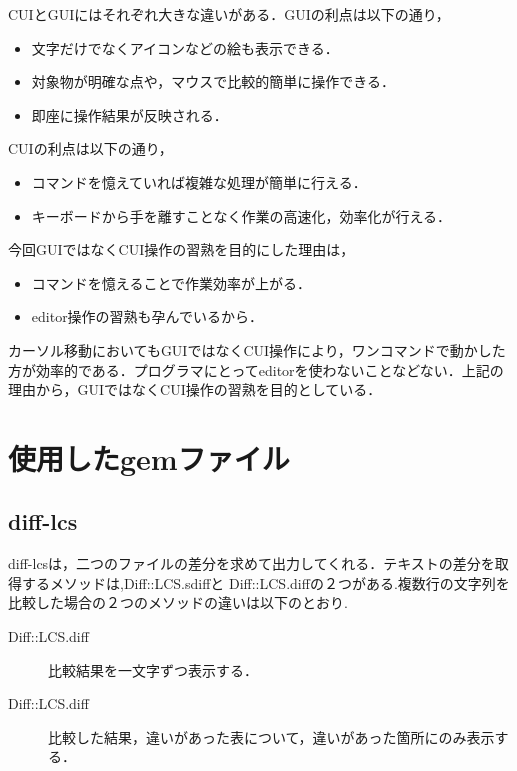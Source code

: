 CUIとGUIにはそれぞれ大きな違いがある．GUIの利点は以下の通り，

\begin{itemize}
\tightlist
\item
  文字だけでなくアイコンなどの絵も表示できる．
\item
  対象物が明確な点や，マウスで比較的簡単に操作できる．
\item
  即座に操作結果が反映される．
\end{itemize}

CUIの利点は以下の通り，

\begin{itemize}
\tightlist
\item
  コマンドを憶えていれば複雑な処理が簡単に行える．
\item
  キーボードから手を離すことなく作業の高速化，効率化が行える．
\end{itemize}

今回GUIではなくCUI操作の習熟を目的にした理由は，

\begin{itemize}
\tightlist
\item
  コマンドを憶えることで作業効率が上がる．
\item
  editor操作の習熟も孕んでいるから．
\end{itemize}

カーソル移動においてもGUIではなくCUI操作により，ワンコマンドで動かした方が効率的である．プログラマにとってeditorを使わないことなどない．上記の理由から，GUIではなくCUI操作の習熟を目的としている．

    \section{使用したgemファイル}\label{ux4f7fux7528ux3057ux305fgemux30d5ux30a1ux30a4ux30eb}

    \subsection{diff-lcs}\label{diff-lcs}

    diff-lcsは，二つのファイルの差分を求めて出力してくれる．テキストの差分を取得するメソッドは,Diff::LCS.sdiffと Diff::LCS.diffの２つがある.複数行の文字列を比較した場合の２つのメソッドの違いは以下のとおり.

\begin{description}
\item[Diff::LCS.diff]
比較結果を一文字ずつ表示する．
\item[Diff::LCS.diff]
比較した結果，違いがあった表について，違いがあった箇所にのみ表示する．
\end{description}

